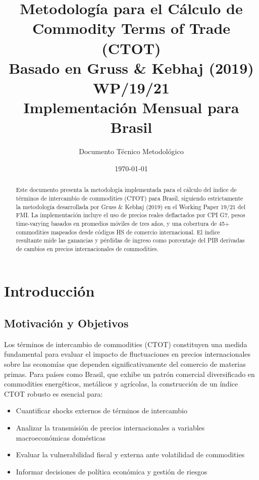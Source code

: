 \documentclass[12pt,a4paper]{article}
\title{\textbf{Metodología para el Cálculo de Commodity Terms of Trade (CTOT)\\
\large Basado en Gruss \& Kebhaj (2019) WP/19/21\\
Implementación Mensual para Brasil}}
\author{Documento Técnico Metodológico}
\date{\today}
\begin{document}
\maketitle

\begin{abstract}
Este documento presenta la metodología implementada para el cálculo del índice de términos de intercambio de commodities (CTOT) para Brasil, siguiendo estrictamente la metodología desarrollada por Gruss \& Kebhaj (2019) en el Working Paper 19/21 del FMI. La implementación incluye el uso de precios reales deflactados por CPI G7, pesos time-varying basados en promedios móviles de tres años, y una cobertura de 45+ commodities mapeados desde códigos HS de comercio internacional. El índice resultante mide las ganancias y pérdidas de ingreso como porcentaje del PIB derivadas de cambios en precios internacionales de commodities.
\end{abstract}

\tableofcontents
\newpage

\section{Introducción}

\subsection{Motivación y Objetivos}

Los términos de intercambio de commodities (CTOT) constituyen una medida fundamental para evaluar el impacto de fluctuaciones en precios internacionales sobre las economías que dependen significativamente del comercio de materias primas. Para países como Brasil, que exhibe un patrón comercial diversificado en commodities energéticos, metálicos y agrícolas, la construcción de un índice CTOT robusto es esencial para:

\begin{itemize}
    \item Cuantificar shocks externos de términos de intercambio
    \item Analizar la transmisión de precios internacionales a variables macroeconómicas domésticas
    \item Evaluar la vulnerabilidad fiscal y externa ante volatilidad de commodities
    \item Informar decisiones de política económica y gestión de riesgos
\end{itemize}
\end{document}
